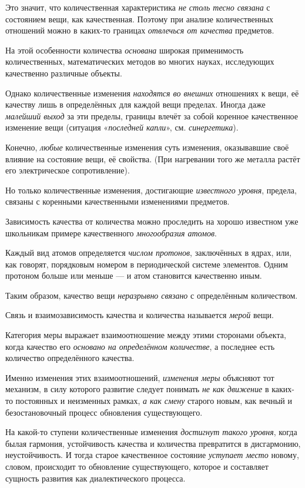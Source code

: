 \documentclass[a4paper,14pt,russian]{extreport}
\begin{document}
Это значит, что количественная характеристика \emph{не столь тесно связана} с состоянием вещи, как качественная. Поэтому при анализе количественных отношений можно в каких-то границах \emph{отвлечься от качества} предметов.

На этой особенности количества \emph{основана} широкая применимость количественных, математических методов во многих науках, исследующих качественно различные объекты.

Однако количественные изменения \emph{находятся во внешних} отношениях к вещи, её качеству лишь в определённых для каждой вещи пределах. Иногда даже \emph{малейший выход} за эти пределы, границы влечёт за собой коренное качественное изменение вещи (ситуация «\emph{последней капли}», см. \emph{синергетика}).

Конечно, \emph{любые} количественные изменения суть изменения, оказывавшие своё влияние на состояние вещи, её свойства. (При нагревании того же металла растёт его электрическое сопротивление).

Но только количественные изменения, достигающие \emph{известного уровня}, предела, связаны с коренными качественными изменениями предметов.

Зависимость качества от количества можно проследить на хорошо известном уже школьникам примере качественного \emph{многообразия атомов}.

Каждый вид атомов определяется \emph{числом протонов}, заключённых в ядрах, или, как говорят, порядковым номером в периодической системе элементов. Одним протоном больше или меньше --- и атом становится качественно иным.

Таким образом, качество вещи \emph{неразрывно связано} с определённым количеством.

Связь и взаимозависимость качества и количества называется \emph{мерой} вещи.

Категория меры выражает взаимоотношение между этими сторонами объекта, когда качество его \emph{основано на определённом количестве}, а последнее есть количество определённого качества.

Именно изменения этих взаимоотношений, \emph{изменения меры} объясняют тот механизм, в силу которого развитие следует понимать \emph{не как движение} в каких-то постоянных и неизменных рамках, \emph{а как смену} старого новым, как вечный и безостановочный процесс обновления существующего.

На какой-то ступени количественные изменения \emph{достигнут такого уровня}, когда былая гармония, устойчивость качества и количества превратится в дисгармонию, неустойчивость. И тогда старое качественное состояние \emph{уступает место} новому, словом, происходит то обновление существующего, которое и составляет сущность развития как диалектического процесса.
\end{document}

